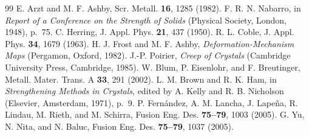 \documentclass[aps,prl,onecolumn,superscriptaddress,amsmath,amssymb,floatfix]{revtex4-2}
\begin{document}
\begin{thebibliography}{99}
 E. Arzt and M. F. Ashby, Scr. Metall. \textbf{16}, 1285 (1982).
 F. R. N. Nabarro, in \emph{Report of a Conference on the Strength of Solids} (Physical Society, London, 1948), p.~75.
 C. Herring, J. Appl. Phys. \textbf{21}, 437 (1950).
 R. L. Coble, J. Appl. Phys. \textbf{34}, 1679 (1963).
 H. J. Frost and M. F. Ashby, \emph{Deformation-Mechanism Maps} (Pergamon, Oxford, 1982).
 J.-P. Poirier, \emph{Creep of Crystals} (Cambridge University Press, Cambridge, 1985).
 W. Blum, P. Eisenlohr, and F. Breutinger, Metall. Mater. Trans. A \textbf{33}, 291 (2002).
 L. M. Brown and R. K. Ham, in \emph{Strengthening Methods in Crystals}, edited by A. Kelly and R. B. Nicholson (Elsevier, Amsterdam, 1971), p.~9.
 P. Fern\'andez, A. M. Lancha, J. Lape\~na, R. Lindau, M. Rieth, and M. Schirra, Fusion Eng. Des. \textbf{75--79}, 1003 (2005).
 G. Yu, N. Nita, and N. Baluc, Fusion Eng. Des. \textbf{75--79}, 1037 (2005).
\end{thebibliography}
\end{document}
